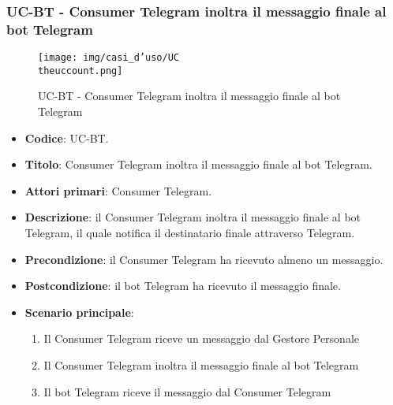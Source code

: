 \subsubsection{UC\theuccount-BT - Consumer Telegram inoltra il messaggio finale al bot Telegram}
	\begin{figure}[H]
		\centering
		\texttt{[image: img/casi\_d'uso/UC\\theuccount.png]}\\
		\caption{UC\theuccount-BT - Consumer Telegram inoltra il messaggio finale al bot Telegram}
	\end{figure}
	\begin{itemize}
		\item \textbf{Codice}: UC\theuccount-BT.
		\item \textbf{Titolo}: Consumer Telegram inoltra il messaggio finale al bot Telegram.
		\item \textbf{Attori primari}: Consumer Telegram.
		\item \textbf{Descrizione}: il Consumer Telegram inoltra il messaggio finale al bot Telegram, il quale notifica il destinatario finale attraverso Telegram.
		\item \textbf{Precondizione}: il Consumer Telegram ha ricevuto almeno un messaggio.
		\item \textbf{Postcondizione}: il bot Telegram ha ricevuto il messaggio finale.
		\item \textbf{Scenario principale}:
		\begin{enumerate}
			\item Il Consumer Telegram riceve un messaggio dal Gestore Personale
			\item Il Consumer Telegram inoltra il messaggio finale al bot Telegram
            \item Il bot Telegram riceve il messaggio dal Consumer Telegram
		\end{enumerate}

	\end{itemize}
